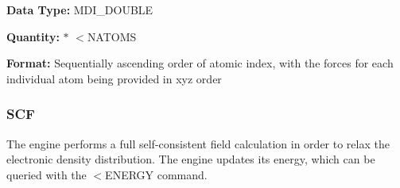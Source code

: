 \begin{DoxyParagraph}{}
{\bfseries  Data Type\-: } M\-D\-I\-\_\-\-D\-O\-U\-B\-L\-E \par
 {\bfseries  Quantity\-: } { $\ast$ $<$N\-A\-T\-O\-M\-S } \par
 {\bfseries  Format\-: } Sequentially ascending order of atomic index, with the forces for each individual atom being provided in xyz order
\end{DoxyParagraph}
\hypertarget{index_scf_command}{}\subsubsection{S\-C\-F}\label{index_scf_command}
The engine performs a full self-\/consistent field calculation in order to relax the electronic density distribution. The engine updates its energy, which can be queried with the {\ttfamily $<$E\-N\-E\-R\-G\-Y} command. 